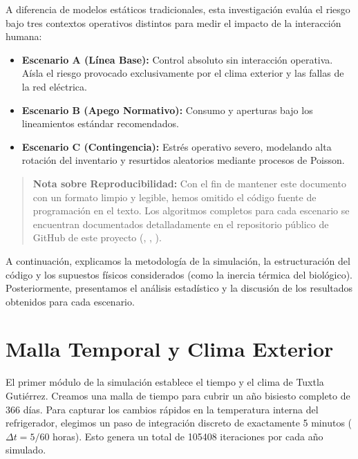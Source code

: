 \documentclass[
  spanish,
  us-letterpaper,
]{scrreprt}
\providecommand{\tightlist}{%
  \setlength{\itemsep}{0pt}\setlength{\parskip}{0pt}}
\numberwithin{equation}{section}
\theoremstyle{plain}
\theoremstyle{plain}
\theoremstyle{plain}
\theoremstyle{definition}
\theoremstyle{remark}
\begin{document}
A diferencia de modelos estáticos tradicionales, esta investigación
evalúa el riesgo bajo tres contextos operativos distintos para medir el
impacto de la interacción humana:

\begin{itemize}
\tightlist
\item
  \textbf{Escenario A (Línea Base):} Control absoluto sin interacción
  operativa. Aísla el riesgo provocado exclusivamente por el clima
  exterior y las fallas de la red eléctrica.
\item
  \textbf{Escenario B (Apego Normativo):} Consumo y aperturas bajo los
  lineamientos estándar recomendados.
\item
  \textbf{Escenario C (Contingencia):} Estrés operativo severo,
  modelando alta rotación del inventario y resurtidos aleatorios
  mediante procesos de Poisson.
\end{itemize}

\begin{quote}
\textbf{Nota sobre Reproducibilidad:} Con el fin de mantener este
documento con un formato limpio y legible, hemos omitido el código
fuente de programación en el texto. Los algoritmos completos para cada
escenario se encuentran documentados detalladamente en el repositorio
público de GitHub de este proyecto
(,
,
).
\end{quote}

A continuación, explicamos la metodología de la simulación, la
estructuración del código y los supuestos físicos considerados (como la
inercia térmica del biológico). Posteriormente, presentamos el análisis
estadístico y la discusión de los resultados obtenidos para cada
escenario.

\section{Malla Temporal y Clima
Exterior}\label{malla-temporal-y-clima-exterior}

El primer módulo de la simulación establece el tiempo y el clima de
Tuxtla Gutiérrez. Creamos una malla de tiempo para cubrir un año
bisiesto completo de 366 días. Para capturar los cambios rápidos en la
temperatura interna del refrigerador, elegimos un paso de integración
discreto de exactamente 5 minutos (\(\Delta t = 5/60\) horas). Esto
genera un total de 105408 iteraciones por cada año simulado.
\end{document}

